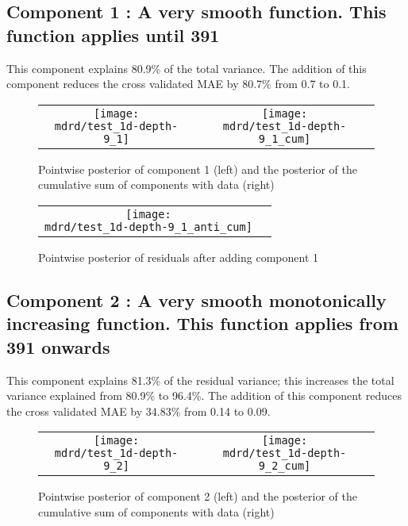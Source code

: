\documentclass{article} %
\begin{document}
\subsection{Component 1 : A very smooth function. This function applies until  391}



This component explains 80.9\% of the total variance.
The addition of this component reduces the cross validated MAE by 80.7\% from 0.7 to 0.1.


\begin{figure}[H]
\newcommand{\wmgd}{0.5\columnwidth}
\newcommand{\hmgd}{3.0cm}
\newcommand{\mdrd}{test_1d-depth-9}
\newcommand{\mbm}{\hspace{-0.3cm}}
\begin{tabular}{cc}
\mbm \texttt{[image: \\mdrd/test\_1d-depth-9\_1]} & \texttt{[image: \\mdrd/test\_1d-depth-9\_1\_cum]}
\end{tabular}
\caption{Pointwise posterior of component 1 (left) and the posterior of the cumulative sum of components with data (right)}
\label{fig:comp1}
\end{figure}

\begin{figure}[H]
\newcommand{\wmgd}{0.5\columnwidth}
\newcommand{\hmgd}{3.0cm}
\newcommand{\mdrd}{test_1d-depth-9}
\newcommand{\mbm}{\hspace{-0.3cm}}
\begin{tabular}{cc}
\mbm \texttt{[image: \\mdrd/test\_1d-depth-9\_1\_anti\_cum]}
\end{tabular}
\caption{Pointwise posterior of residuals after adding component 1}
\label{fig:comp1}
\end{figure}

\subsection{Component 2 : A very smooth monotonically increasing function. This function applies from  391 onwards}



This component explains 81.3\% of the residual variance; this increases the total variance explained from 80.9\% to 96.4\%.
The addition of this component reduces the cross validated MAE by 34.83\% from 0.14 to 0.09.


\begin{figure}[H]
\newcommand{\wmgd}{0.5\columnwidth}
\newcommand{\hmgd}{3.0cm}
\newcommand{\mdrd}{test_1d-depth-9}
\newcommand{\mbm}{\hspace{-0.3cm}}
\begin{tabular}{cc}
\mbm \texttt{[image: \\mdrd/test\_1d-depth-9\_2]} & \texttt{[image: \\mdrd/test\_1d-depth-9\_2\_cum]}
\end{tabular}
\caption{Pointwise posterior of component 2 (left) and the posterior of the cumulative sum of components with data (right)}
\label{fig:comp2}
\end{figure}
\end{document}
